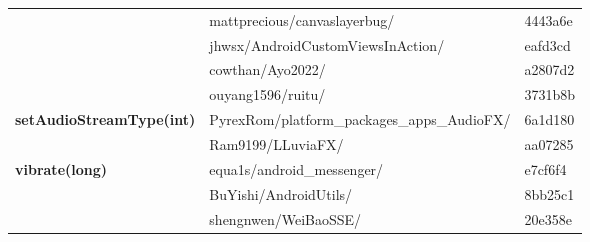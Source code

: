 \begin{longtable}{ |p{12em}|p{6em}|p{4em} | }
 & mattprecious/canvaslayerbug/ & 4443a6e\\\cline{2-3}
 & jhwsx/AndroidCustomViewsInAction/ & eafd3cd\\\cline{2-3}
 & cowthan/Ayo2022/ & a2807d2\\\cline{2-3}
 & ouyang1596/ruitu/ & 3731b8b\\\cline{2-3}
 \hline
 \multirow{2}{*}{\textbf{setAudioStreamType(int)}} & PyrexRom/platform_packages_apps_AudioFX/ & 6a1d180\\\cline{2-3}
 & Ram9199/LLuviaFX/ & aa07285\\\cline{2-3}
 \hline
 \multirow{3}{*}{\textbf{vibrate(long)}} & equa1s/android_messenger/ & e7cf6f4\\\cline{2-3}
 & BuYishi/AndroidUtils/ & 8bb25c1\\\cline{2-3}
 & shengnwen/WeiBaoSSE/ & 20e358e\\\cline{2-3}
 \hline
\end{longtable}